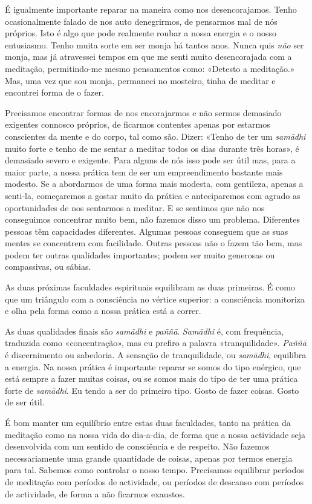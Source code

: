 É igualmente importante reparar na maneira como nos desencorajamos.
Tenho ocasionalmente falado de nos auto denegrirmos, de pensarmos mal de
nós próprios. Isto é algo que pode realmente roubar a nossa energia e o
nosso entusiasmo. Tenho muita sorte em ser monja há tantos anos. Nunca
quis \emph{não} ser monja, mas já atravessei tempos em que me senti
muito desencorajada com a meditação, permitindo-me mesmo pensamentos
como: «Detesto a meditação.» Mas, uma vez que sou monja, permaneci no
mosteiro, tinha de meditar e encontrei forma de o fazer.

Precisamos encontrar formas de nos encorajarmos e não sermos demasiado
exigentes connosco próprios, de ficarmos contentes apenas por estarmos
conscientes da mente e do corpo, tal como são. Dizer: «Tenho de ter um
\emph{samādhi} muito forte e tenho de me sentar a meditar todos os dias
durante três horas», é demasiado severo e exigente. Para alguns de nós
isso pode ser útil mas, para a maior parte, a nossa prática tem de ser
um empreendimento bastante mais modesto. Se a abordarmos de uma forma
mais modesta, com gentileza, apenas a senti-la, começaremos a gostar
muito da prática e anteciparemos com agrado as oportunidades de nos
sentarmos a meditar. E se sentimos que não nos conseguimos concentrar
muito bem, não fazemos disso um problema. Diferentes pessoas têm
capacidades diferentes. Algumas pessoas conseguem que as suas mentes se
concentrem com facilidade. Outras pessoas não o fazem tão bem, mas podem
ter outras qualidades importantes; podem ser muito generosas ou
compassivas, ou sábias.

As duas próximas faculdades espirituais equilibram as duas primeiras. É
como que um triângulo com a consciência no vértice superior: a
consciência monitoriza e olha pela forma como a nossa prática está a
correr.

As duas qualidades finais são \emph{samādhi} e \emph{paññā}.
\emph{Samādhi} é, com frequência, traduzida como «concentração», mas eu
prefiro a palavra «tranquilidade». \emph{Paññā} é discernimento ou
sabedoria. A sensação de tranquilidade, ou \emph{samādhi}, equilibra a
energia. Na nossa prática é importante reparar se somos do tipo
enérgico, que está sempre a fazer muitas coisas, ou se somos mais do
tipo de ter uma prática forte de \emph{samādhi}. Eu tendo a ser do
primeiro tipo. Gosto de fazer coisas. Gosto de ser útil.

É bom manter um equilíbrio entre estas duas faculdades, tanto na prática
da meditação como na nossa vida do dia-a-dia, de forma que a nossa
actividade seja desenvolvida com um sentido de consciência e de
respeito. Não fazemos necessariamente uma grande quantidade de coisas,
apenas por termos energia para tal. Sabemos como controlar o nosso
tempo. Precisamos equilibrar períodos de meditação com períodos de
actividade, ou períodos de descanso com períodos de actividade, de forma
a não ficarmos exaustos.

